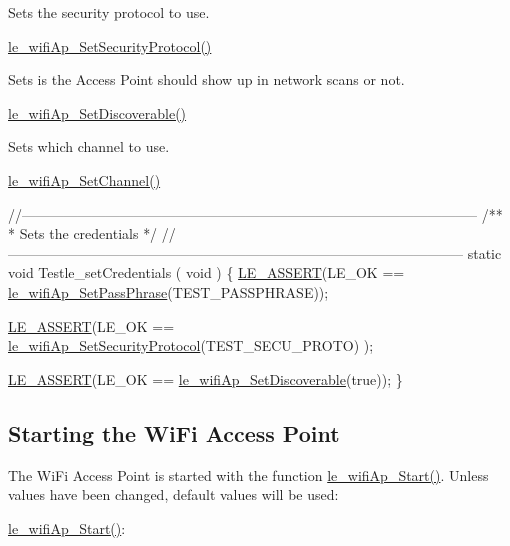 Sets the security protocol to use.
\begin{DoxyItemize}
\item \hyperlink{le__wifi_ap__interface_8h_a0985bb7661b81c6882a170855c7c8298}{le\+\_\+wifi\+Ap\+\_\+\+Set\+Security\+Protocol()}
\end{DoxyItemize}

Sets is the Access Point should show up in network scans or not.
\begin{DoxyItemize}
\item \hyperlink{le__wifi_ap__interface_8h_a53d220d33f1c7d7560605b5bffc13c80}{le\+\_\+wifi\+Ap\+\_\+\+Set\+Discoverable()}
\end{DoxyItemize}

Sets which channel to use.
\begin{DoxyItemize}
\item \hyperlink{le__wifi_ap__interface_8h_a686036419f15a4253c28a41c6d2dc759}{le\+\_\+wifi\+Ap\+\_\+\+Set\+Channel()}
\end{DoxyItemize}


\begin{DoxyCodeInclude}
\textcolor{comment}{//--------------------------------------------------------------------------------------------------}\textcolor{comment}{}
\textcolor{comment}{/**}
\textcolor{comment}{ * Sets the credentials}
\textcolor{comment}{ */}
\textcolor{comment}{//--------------------------------------------------------------------------------------------------}
\textcolor{keyword}{static} \textcolor{keywordtype}{void} Testle\_setCredentials
(
    \textcolor{keywordtype}{void}
)
\{
    \hyperlink{le__log_8h_ac0dbbef91dc0fed449d0092ff0557b39}{LE\_ASSERT}(LE\_OK == \hyperlink{le__wifi_ap__interface_8h_a8be6c0c7aad3e14f492898df6f131c5b}{le\_wifiAp\_SetPassPhrase}(TEST\_PASSPHRASE));

    \hyperlink{le__log_8h_ac0dbbef91dc0fed449d0092ff0557b39}{LE\_ASSERT}(LE\_OK == \hyperlink{le__wifi_ap__interface_8h_a0985bb7661b81c6882a170855c7c8298}{le\_wifiAp\_SetSecurityProtocol}(TEST\_SECU\_PROTO)
      );

    \hyperlink{le__log_8h_ac0dbbef91dc0fed449d0092ff0557b39}{LE\_ASSERT}(LE\_OK == \hyperlink{le__wifi_ap__interface_8h_a53d220d33f1c7d7560605b5bffc13c80}{le\_wifiAp\_SetDiscoverable}(\textcolor{keyword}{true}));
\}
\end{DoxyCodeInclude}
 \hypertarget{c_le_wifi_ap_le_wifiAp_Start}{}\subsection{Starting the Wi\+Fi Access Point}\label{c_le_wifi_ap_le_wifiAp_Start}
The Wi\+Fi Access Point is started with the function \hyperlink{le__wifi_ap__interface_8h_ad21bdeabf6a8c923d246ef3c28ac42a0}{le\+\_\+wifi\+Ap\+\_\+\+Start()}. Unless values have been changed, default values will be used\+:
\begin{DoxyItemize}
\item \hyperlink{le__wifi_ap__interface_8h_ad21bdeabf6a8c923d246ef3c28ac42a0}{le\+\_\+wifi\+Ap\+\_\+\+Start()}\+:
\end{DoxyItemize}

